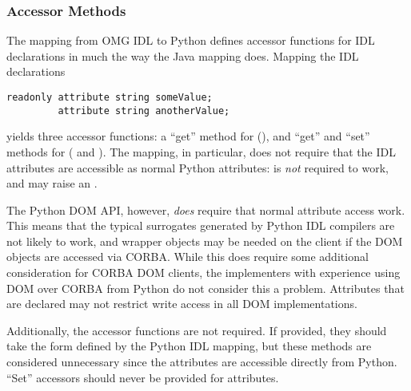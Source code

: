 \subsubsection{Accessor Methods \label{dom-accessor-methods}}

The mapping from OMG IDL to Python defines accessor functions for IDL
 declarations in much the way the Java mapping
does.  Mapping the IDL declarations

\begin{verbatim}
readonly attribute string someValue;
         attribute string anotherValue;
\end{verbatim}

yields three accessor functions:  a ``get'' method for
 (), and ``get'' and
``set'' methods for
 ( and
).  The mapping, in particular, does not
require that the IDL attributes are accessible as normal Python
attributes:   is \emph{not} required to
work, and may raise an .

The Python DOM API, however, \emph{does} require that normal attribute
access work.  This means that the typical surrogates generated by
Python IDL compilers are not likely to work, and wrapper objects may
be needed on the client if the DOM objects are accessed via CORBA.
While this does require some additional consideration for CORBA DOM
clients, the implementers with experience using DOM over CORBA from
Python do not consider this a problem.  Attributes that are declared
 may not restrict write access in all DOM
implementations.

Additionally, the accessor functions are not required.  If provided,
they should take the form defined by the Python IDL mapping, but
these methods are considered unnecessary since the attributes are
accessible directly from Python.  ``Set'' accessors should never be
provided for  attributes.
